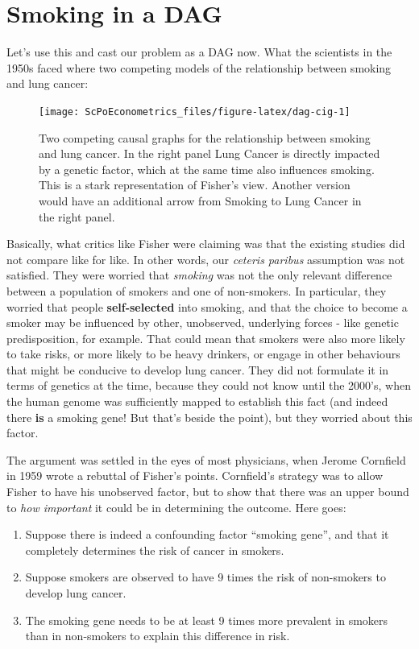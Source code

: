 \documentclass[]{book}
\providecommand{\tightlist}{%
  \setlength{\itemsep}{0pt}\setlength{\parskip}{0pt}}
\begin{document}
\section{Smoking in a DAG}\label{smoking-in-a-dag}

Let's use this and cast our problem as a DAG now. What the scientists in
the 1950s faced where two competing models of the relationship between
smoking and lung cancer:

\begin{figure}

{\centering \texttt{[image: ScPoEconometrics\_files/figure-latex/dag-cig-1]} 

}

\caption{Two competing causal graphs for the relationship between smoking and lung cancer. In the right panel Lung Cancer is directly impacted by a genetic factor, which at the same time also influences smoking. This is a stark representation of Fisher's view. Another version would have an additional arrow from Smoking to Lung Cancer in the right panel.}\label{fig:dag-cig}
\end{figure}

Basically, what critics like Fisher were claiming was that the existing
studies did not compare like for like. In other words, our \emph{ceteris
paribus} assumption was not satisfied. They were worried that
\emph{smoking} was not the only relevant difference between a population
of smokers and one of non-smokers. In particular, they worried that
people \textbf{self-selected} into smoking, and that the choice to
become a smoker may be influenced by other, unobserved, underlying
forces - like genetic predisposition, for example. That could mean that
smokers were also more likely to take risks, or more likely to be heavy
drinkers, or engage in other behaviours that might be conducive to
develop lung cancer. They did not formulate it in terms of genetics at
the time, because they could not know until the 2000's, when the human
genome was sufficiently mapped to establish this fact (and indeed there
\textbf{is} a smoking gene! But that's beside the point), but they
worried about this factor.

The argument was settled in the eyes of most physicians, when Jerome
Cornfield in 1959 wrote a rebuttal of Fisher's points. Cornfield's
strategy was to allow Fisher to have his unobserved factor, but to show
that there was an upper bound to \emph{how important} it could be in
determining the outcome. Here goes:

\begin{enumerate}
\def\labelenumi{\arabic{enumi}.}
\tightlist
\item
  Suppose there is indeed a confounding factor ``smoking gene'', and
  that it completely determines the risk of cancer in smokers.
\item
  Suppose smokers are observed to have 9 times the risk of non-smokers
  to develop lung cancer.
\item
  The smoking gene needs to be at least 9 times more prevalent in
  smokers than in non-smokers to explain this difference in risk.
\end{enumerate}
\end{document}
